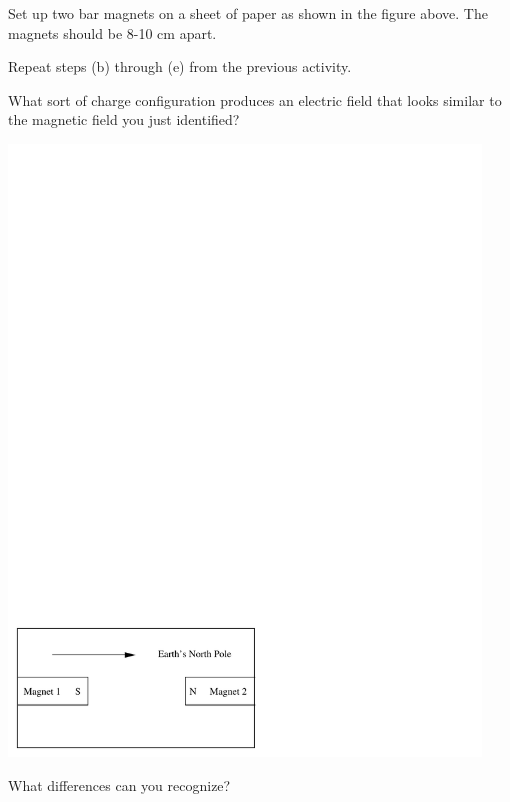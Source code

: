 \begin{enumerate}[labparts]
\begin{minipage}{0.5\textwidth}
\item Set up two bar magnets on a sheet of paper as shown in the figure
above. The magnets should be 8-10 cm apart.
\item Repeat steps (b) through (e) from the previous activity.
\item What sort of charge configuration produces an electric field that
looks similar to the magnetic field you just identified?
\vspace{2mm}
\end{minipage}
\begin{minipage}{0.49\textwidth}
\hspace{0.05\textwidth}\includegraphics[trim={0 0 3.5mm 0},clip,width=0.94\textwidth]{magnetism_field_perm_mag/magnetism_2_fig_2.pdf}
\end{minipage}
\answerspace{30mm}

\item What differences can you recognize?
\answerspace{30mm}
\end{enumerate}

